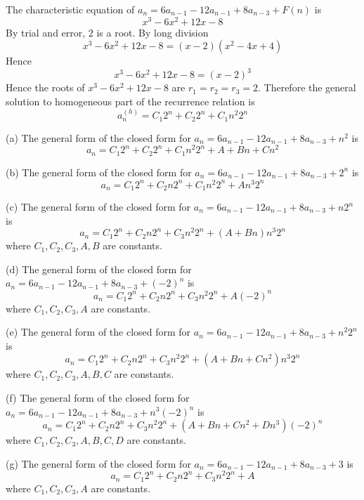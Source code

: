 
The characteristic equation of 
$a_n = 6 a_{n - 1} - 12 a_{n - 1} + 8 a_{n - 3} + F(n)$
is
\[
x^3 - 6 x^2 + 12 x - 8
\]
By trial and error, $2$ is a root.
By long division
\[
x^3 - 6 x^2 + 12 x - 8 = (x - 2)(x^2 - 4x + 4)
\]
Hence
\[
x^3 - 6 x^2 + 12 x - 8 = (x - 2)^3
\]
Hence the roots of $x^3 - 6 x^2 + 12 x - 8$ are $r_1 = r_2 = r_3 = 2$.
Therefore the general solution to homogeneous part of the
recurrence relation is
\[
a^{(h)}_n = C_1 2^n + C_2 2^n + C_1 n^2 2^n 
\]

(a)
The general form of
the closed form for $a_n = 6 a_{n - 1} - 12 a_{n - 1} + 8 a_{n - 3} + n^2$
is
\[
a_n = C_1 2^n + C_2 2^n + C_1 n^2 2^n + A + Bn + Cn^2
\]


(b)
The general form of
the closed form for $a_n = 6 a_{n - 1} - 12 a_{n - 1} + 8 a_{n - 3} + 2^n$
is
\[
a_n = C_1 2^n + C_2 n2^n + C_1 n^2 2^n + An^3 2^n
\]


(c)
The general form of
the closed form for $a_n = 6 a_{n - 1} - 12 a_{n - 1} + 8 a_{n - 3} + n2^n$
is
\[
a_n = C_1 2^n + C_2 n2^n + C_3 n^2 2^n + (A + Bn)n^3 2^n
\]
where $C_1, C_2, C_3, A, B$ are constants.


(d)
The general form of
the closed form for $a_n = 6 a_{n - 1} - 12 a_{n - 1} + 8 a_{n - 3} + (-2)^n$
is
\[
a_n = C_1 2^n + C_2 n2^n + C_3 n^2 2^n + A(-2)^n
\]
where $C_1, C_2, C_3, A$ are constants.


(e)
The general form of
the closed form for $a_n = 6 a_{n - 1} - 12 a_{n - 1} + 8 a_{n - 3} + n^2 2^n$
is
\[
a_n = C_1 2^n + C_2 n2^n + C_3 n^2 2^n + (A + Bn + Cn^2) n^3 2^n
\]
where $C_1, C_2, C_3, A, B, C$ are constants.


(f)
The general form of
the closed form for $a_n = 6 a_{n - 1} - 12 a_{n - 1} + 8 a_{n - 3} + n^3 (-2)^n$
is
\[
a_n = C_1 2^n + C_2 n2^n + C_3 n^2 2^n + (A + Bn + Cn^2 + Dn^3)(-2)^n
\]
where $C_1, C_2, C_3, A, B, C, D$ are constants.


(g)
The general form of
the closed form for $a_n = 6 a_{n - 1} - 12 a_{n - 1} + 8 a_{n - 3} + 3$
is
\[
a_n = C_1 2^n + C_2 n2^n + C_3 n^2 2^n + A
\]
where $C_1, C_2, C_3, A$ are constants.
